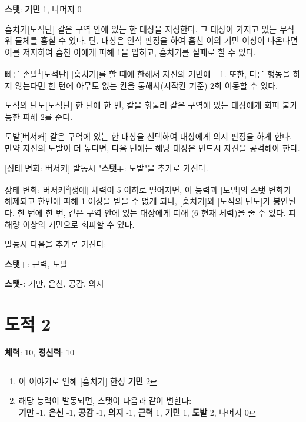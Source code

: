 \documentclass{report}
\begin{document}
	\textbf{스탯}: \textbf{기민} 1, 나머지 0
	
	\begin{story}{훔치기}{[도적단]}
		같은 구역 안에 있는 한 대상을 지정한다. 그 대상이 가지고 있는 무작위 물체를 훔칠 수 있다. 단, 대상은 인식 판정을 하여 훔친 이의 기민 이상이 나온다면 이를 저지하여 훔친 이에게 피해 1을 입히고, 훔치기를 실패로 할 수 있다.
	\end{story}
	
	\begin{story}{빠른 손발\footnote{이 이야기로 인해 [훔치기] 한정 \textbf{기민} 2}}{[도적단]}
		[훔치기]를 할 때에 한해서 자신의 기민에 +1. 또한, 다른 행동을 하지 않는다면 한 턴에 아무도 없는 칸을 통해서(시작칸 기준) 2회 이동할 수 있다.
	\end{story}
	
	\begin{story}{도적의 단도}{[도적단]}
		한 턴에 한 번, 칼을 휘둘러 같은 구역에 있는 대상에게 회피 불가능한 피해 2를 준다.
	\end{story}
	
	\begin{story}{도발}{[버서커]}
		같은 구역에 있는 한 대상을 선택하여 대상에게 의지 판정을 하게 한다. 만약 자신의 도발이 더 높다면, 다음 턴에는 해당 대상은 반드시 자신을 공격해야 한다.
		
		[상태 변화: 버서커] 발동시 "\textbf{스탯+}: 도발"을 추가로 가진다.
	\end{story}
	
	\begin{story}{상태 변화: 버서커\footnote{해당 능력이 발동되면, 스탯이 다음과 같이 변한다:\\ \textbf{기만} -1, \textbf{은신} -1, \textbf{공감} -1, \textbf{의지} -1, \textbf{근력} 1, \textbf{기민} 1, \textbf{도발} 2, 나머지 0}}{[생애]}
		체력이 5 이하로 떨어지면, 이 능력과 [도발]의 스탯 변화가 해제되고 한번에 피해 1 이상을 받을 수 없게 되나, [훔치기]와 [도적의 단도]가 봉인된다. 한 턴에 한 번, 같은 구역 안에 있는 대상에게 피해 (6-현재 체력)을 줄 수 있다. 피해량 이상의 기민으로 회피할 수 있다.
		
		발동시 다음을 추가로 가진다:
		
		\textbf{스탯+}: 근력, 도발
		
		\textbf{스탯-}: 기만, 은신, 공감, 의지
	\end{story}
	
	\section*{도적 2}
	\textbf{체력}: 10, \textbf{정신력}: 10
	
\end{document}
